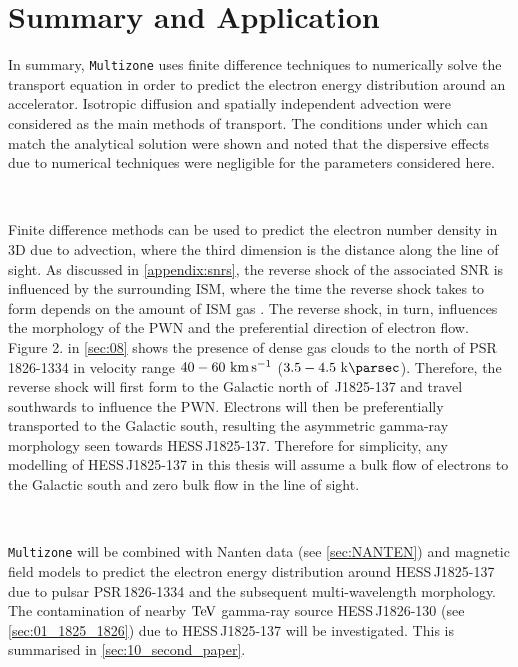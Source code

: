 \section{Summary and Application}

In summary, {\tt Multizone} uses finite difference techniques to numerically solve the transport equation in order to predict the electron energy distribution around an accelerator. Isotropic diffusion and spatially independent advection were considered as the main methods of transport. The conditions under which \multizone can match the analytical solution were shown and noted that the dispersive effects due to numerical techniques were negligible for the parameters considered here.
\par~\par
Finite difference methods can be used to predict the electron number density in 3D due to advection, where the third dimension is the distance along the line of sight. As discussed in \autoref{appendix:snrs}, the reverse shock of the associated SNR is influenced by the surrounding ISM, where the time the reverse shock takes to form depends on the amount of ISM gas \citep{alma9928040781501811}. The reverse shock, in turn, influences the morphology of the PWN and the preferential direction of electron flow. Figure 2. in \autoref{sec:08} shows the presence of dense gas clouds to the north of \mbox{PSR\,1826-1334} in velocity range $40-60~\si{\kilo\meter\per\second}$ ($3.5-4.5~\kpc$). Therefore, the reverse shock will first form to the Galactic north of \mbox{\HESS\,J1825-137} and travel southwards to influence the PWN. Electrons will then be preferentially transported to the Galactic south, resulting the asymmetric gamma-ray morphology seen towards \mbox{HESS\,J1825-137}. Therefore for simplicity, any modelling of \mbox{HESS\,J1825-137} in this thesis will assume a bulk flow of electrons to the Galactic south and zero bulk flow in the line of sight.
\par~\par
{\tt Multizone} will be combined with Nanten data (see \autoref{sec:NANTEN}) and magnetic field models to predict the electron energy distribution around \mbox{HESS\,J1825-137} due to pulsar \mbox{PSR\,1826-1334} and the subsequent multi-wavelength morphology. The contamination of nearby $\TeV$ gamma-ray source \mbox{HESS\,J1826-130} (see \autoref{sec:01_1825_1826}) due to \mbox{HESS\,J1825-137} will be investigated. This is summarised in \autoref{sec:10_second_paper}.